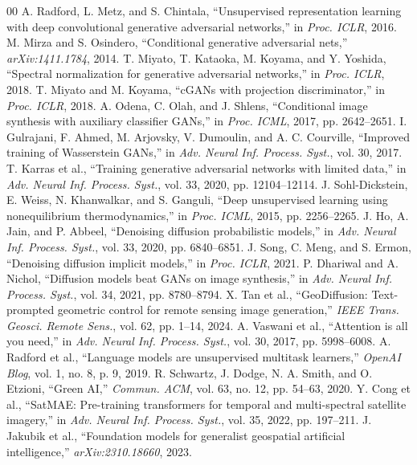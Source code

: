 \documentclass[journal]{IEEEtran}
\begin{document}
\begin{thebibliography}{00}
 A. Radford, L. Metz, and S. Chintala, ``Unsupervised representation learning with deep convolutional generative adversarial networks,'' in \textit{Proc. ICLR}, 2016.
 M. Mirza and S. Osindero, ``Conditional generative adversarial nets,'' \textit{arXiv:1411.1784}, 2014.
 T. Miyato, T. Kataoka, M. Koyama, and Y. Yoshida, ``Spectral normalization for generative adversarial networks,'' in \textit{Proc. ICLR}, 2018.
 T. Miyato and M. Koyama, ``cGANs with projection discriminator,'' in \textit{Proc. ICLR}, 2018.
 A. Odena, C. Olah, and J. Shlens, ``Conditional image synthesis with auxiliary classifier GANs,'' in \textit{Proc. ICML}, 2017, pp. 2642--2651.
 I. Gulrajani, F. Ahmed, M. Arjovsky, V. Dumoulin, and A. C. Courville, ``Improved training of Wasserstein GANs,'' in \textit{Adv. Neural Inf. Process. Syst.}, vol. 30, 2017.
 T. Karras et al., ``Training generative adversarial networks with limited data,'' in \textit{Adv. Neural Inf. Process. Syst.}, vol. 33, 2020, pp. 12104--12114.
 J. Sohl-Dickstein, E. Weiss, N. Khanwalkar, and S. Ganguli, ``Deep unsupervised learning using nonequilibrium thermodynamics,'' in \textit{Proc. ICML}, 2015, pp. 2256--2265.
 J. Ho, A. Jain, and P. Abbeel, ``Denoising diffusion probabilistic models,'' in \textit{Adv. Neural Inf. Process. Syst.}, vol. 33, 2020, pp. 6840--6851.
 J. Song, C. Meng, and S. Ermon, ``Denoising diffusion implicit models,'' in \textit{Proc. ICLR}, 2021.
 P. Dhariwal and A. Nichol, ``Diffusion models beat GANs on image synthesis,'' in \textit{Adv. Neural Inf. Process. Syst.}, vol. 34, 2021, pp. 8780--8794.
 X. Tan et al., ``GeoDiffusion: Text-prompted geometric control for remote sensing image generation,'' \textit{IEEE Trans. Geosci. Remote Sens.}, vol. 62, pp. 1--14, 2024.
 A. Vaswani et al., ``Attention is all you need,'' in \textit{Adv. Neural Inf. Process. Syst.}, vol. 30, 2017, pp. 5998--6008.
 A. Radford et al., ``Language models are unsupervised multitask learners,'' \textit{OpenAI Blog}, vol. 1, no. 8, p. 9, 2019.
 R. Schwartz, J. Dodge, N. A. Smith, and O. Etzioni, ``Green AI,'' \textit{Commun. ACM}, vol. 63, no. 12, pp. 54--63, 2020.
 Y. Cong et al., ``SatMAE: Pre-training transformers for temporal and multi-spectral satellite imagery,'' in \textit{Adv. Neural Inf. Process. Syst.}, vol. 35, 2022, pp. 197--211.
 J. Jakubik et al., ``Foundation models for generalist geospatial artificial intelligence,'' \textit{arXiv:2310.18660}, 2023.
\end{thebibliography}
\end{document}
